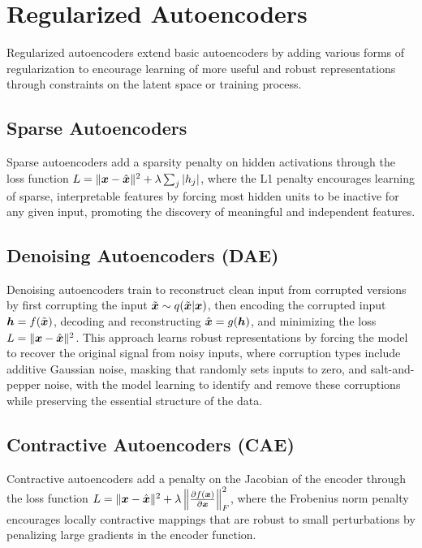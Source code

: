 
\section{Regularized Autoencoders }
\label{sec:regularized-ae}

Regularized autoencoders extend basic autoencoders by adding various forms of regularization to encourage learning of more useful and robust representations through constraints on the latent space or training process.

\subsection{Sparse Autoencoders}

Sparse autoencoders add a sparsity penalty on hidden activations through the loss function $L = \|\boldsymbol{x} - \hat{\boldsymbol{x}}\|^2 + \lambda \sum_j |h_j|$, where the L1 penalty encourages learning of sparse, interpretable features by forcing most hidden units to be inactive for any given input, promoting the discovery of meaningful and independent features.

\subsection{Denoising Autoencoders (DAE)}

Denoising autoencoders train to reconstruct clean input from corrupted versions by first corrupting the input $\tilde{\boldsymbol{x}} \sim q(\tilde{\boldsymbol{x}}|\boldsymbol{x})$, then encoding the corrupted input $\boldsymbol{h} = f(\tilde{\boldsymbol{x}})$, decoding and reconstructing $\hat{\boldsymbol{x}} = g(\boldsymbol{h})$, and minimizing the loss $L = \|\boldsymbol{x} - \hat{\boldsymbol{x}}\|^2$. This approach learns robust representations by forcing the model to recover the original signal from noisy inputs, where corruption types include additive Gaussian noise, masking that randomly sets inputs to zero, and salt-and-pepper noise, with the model learning to identify and remove these corruptions while preserving the essential structure of the data.

\subsection{Contractive Autoencoders (CAE)}

Contractive autoencoders add a penalty on the Jacobian of the encoder through the loss function $L = \|\boldsymbol{x} - \hat{\boldsymbol{x}}\|^2 + \lambda \left\|\frac{\partial f(\boldsymbol{x})}{\partial \boldsymbol{x}}\right\|_F^2$, where the Frobenius norm penalty encourages locally contractive mappings that are robust to small perturbations by penalizing large gradients in the encoder function.

